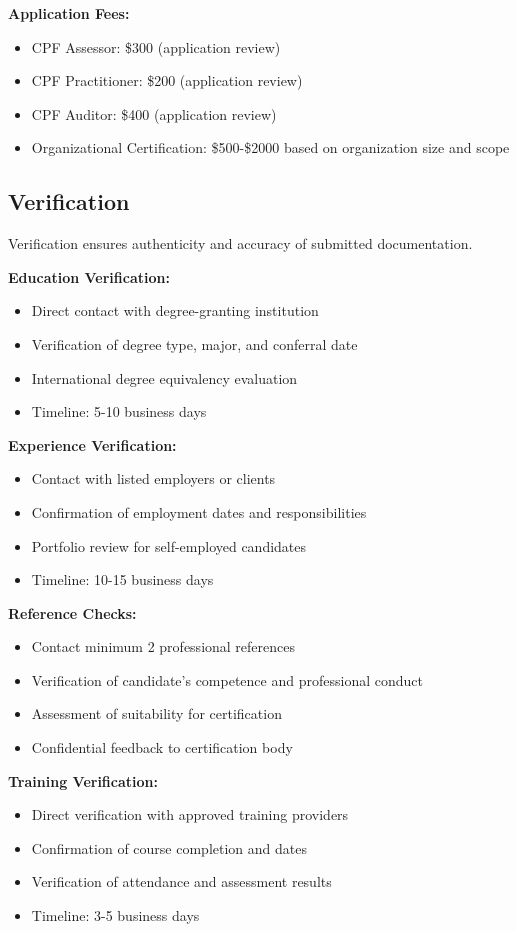 \documentclass[11pt,a4paper]{article}
\begin{document}
\textbf{Application Fees:}
\begin{itemize}
\item CPF Assessor: \$300 (application review)
\item CPF Practitioner: \$200 (application review)
\item CPF Auditor: \$400 (application review)
\item Organizational Certification: \$500-\$2000 based on organization size and scope
\end{itemize}

\subsection{Verification}

Verification ensures authenticity and accuracy of submitted documentation.

\textbf{Education Verification:}
\begin{itemize}
\item Direct contact with degree-granting institution
\item Verification of degree type, major, and conferral date
\item International degree equivalency evaluation
\item Timeline: 5-10 business days
\end{itemize}

\textbf{Experience Verification:}
\begin{itemize}
\item Contact with listed employers or clients
\item Confirmation of employment dates and responsibilities
\item Portfolio review for self-employed candidates
\item Timeline: 10-15 business days
\end{itemize}

\textbf{Reference Checks:}
\begin{itemize}
\item Contact minimum 2 professional references
\item Verification of candidate's competence and professional conduct
\item Assessment of suitability for certification
\item Confidential feedback to certification body
\end{itemize}

\textbf{Training Verification:}
\begin{itemize}
\item Direct verification with approved training providers
\item Confirmation of course completion and dates
\item Verification of attendance and assessment results
\item Timeline: 3-5 business days
\end{itemize}
\end{document}
